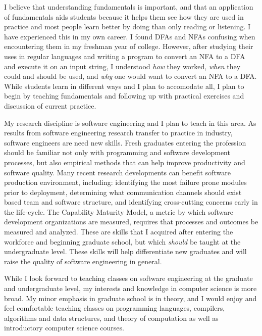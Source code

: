 \documentclass[10pt]{article}
\begin{document}
I believe that understanding fundamentals is important, and that an application
of fundamentals aids students because it helps them see how they are used in
practice and most people learn better by doing than only reading or listening.
I have experienced this in my own career.  I found DFAs and NFAs confusing when
encountering them in my freshman year of college.  However, after studying
their uses in regular languages and writing a program to convert an NFA to a
DFA and execute it on an input string, I understood \emph{how} they worked,
\emph{when} they could and should be used, and \emph{why} one would want to
convert an NFA to a DFA.  While students learn in different ways and I plan to
accomodate all, I plan to begin by teaching fundamentals and following up with
practical exercises and discussion of current practice.

My research discipline is software engineering and I plan to teach in this
area.  As results from software engineering research transfer to practice in
industry, software engineers are need new skills. Fresh graduates entering the
profession should be familiar not only with programming and software
development processes, but also empirical methods that can help improve
productivity and software quality.  Many recent research developments can
benefit software production environment, including: identifying the most
failure prone modules prior to deployment, determining what communication
channels should exist based team and software structure, and identifying
cross-cutting concerns early in the life-cycle.  The Capability Maturity Model,
a metric by which software development organizations are measured, requires
that processes and outcomes be measured and analyzed.  These are skills that I
acquired after entering the workforce and beginning graduate school, but which
\emph{should} be taught at the undergraduate level.  These skills will help
differentiate new graduates and will raise the quality of software engineering
in general.

While I look forward to teaching classes on software engineering at the
graduate and undergraduate level, my interests and knowledge in computer
science is more broad.  My minor emphasis in graduate school is in theory, and I
would enjoy and feel comfortable teaching classes on programming languages,
compilers, algorithms and data structures, and theory of computation as well as
introductory computer science courses.
\end{document}
